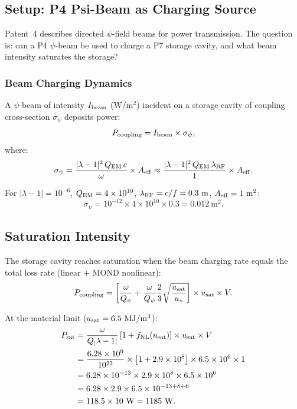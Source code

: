 \documentclass[aps,prd,twocolumn,superscriptaddress]{revtex4-2}
\newcommand{\Qpsi}{Q_\psi}
\newcommand{\lam}{|\lambda-1|}
\begin{document}
\subsection{Setup: P4 Psi-Beam as Charging Source}

Patent~4 describes directed $\psi$-field beams for power transmission.
The question is: can a P4 $\psi$-beam be used to charge a P7 storage
cavity, and what beam intensity saturates the storage?

\subsubsection{Beam Charging Dynamics}

A $\psi$-beam of intensity $I_{\rm beam}$ (W/m$^2$) incident on a
storage cavity of coupling cross-section $\sigma_\psi$ deposits
power:
\begin{equation}
P_{\rm coupling} = I_{\rm beam}\times\sigma_\psi,
\end{equation}
where:
\begin{equation}
\sigma_\psi = \frac{\lam^2\,Q_{\rm EM}\,c}{\omega}\times A_{\rm eff}
\approx \frac{\lam^2\,Q_{\rm EM}\,\lambda_{\rm RF}}{1}\times A_{\rm eff}.
\end{equation}

For $\lam = 10^{-6}$, $Q_{\rm EM} = 4\times 10^{10}$,
$\lambda_{\rm RF} = c/f = 0.3~\mathrm{m}$,
$A_{\rm eff} = 1~\mathrm{m^2}$:
\begin{equation}
\sigma_\psi = 10^{-12}\times 4\times 10^{10}\times 0.3 = 0.012~\mathrm{m^2}.
\end{equation}

\subsection{Saturation Intensity}

The storage cavity reaches saturation when the beam charging rate
equals the total loss rate (linear + MOND nonlinear):
\begin{equation}
P_{\rm coupling} = \left[\frac{\omega}{\Qpsi}
+ \frac{\omega}{\Qpsi}\frac{2}{3}\sqrt{\frac{u_{\rm sat}}{u_*}}\right]
\times u_{\rm sat}\times V.
\end{equation}

At the material limit ($u_{\rm sat} = 6.5~\mathrm{MJ/m^3}$):
\begin{align}
P_{\rm sat} &= \frac{\omega}{Q_\lam}\left[1 + f_{\rm NL}(u_{\rm sat})\right]
\times u_{\rm sat}\times V \notag\\
&= \frac{6.28\times 10^9}{10^{22}}
\times\left[1 + 2.9\times 10^8\right]
\times 6.5\times 10^6\times 1 \notag\\
&= 6.28\times 10^{-13}\times 2.9\times 10^8\times 6.5\times 10^6 \notag\\
&= 6.28\times 2.9\times 6.5\times 10^{-13+8+6} \notag\\
&= 118.5\times 10~\mathrm{W} = 1185~\mathrm{W}.
\end{align}
\end{document}
